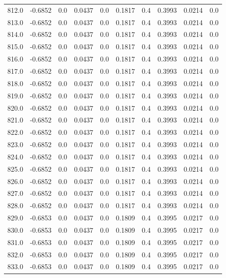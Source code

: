 \begin{longtable}{lrrrrrrrrr}
812.0 & -0.6852 & 0.0 & 0.0437 & 0.0 & 0.1817 & 0.4 & 0.3993 & 0.0214 & 0.0 \\
813.0 & -0.6852 & 0.0 & 0.0437 & 0.0 & 0.1817 & 0.4 & 0.3993 & 0.0214 & 0.0 \\
814.0 & -0.6852 & 0.0 & 0.0437 & 0.0 & 0.1817 & 0.4 & 0.3993 & 0.0214 & 0.0 \\
815.0 & -0.6852 & 0.0 & 0.0437 & 0.0 & 0.1817 & 0.4 & 0.3993 & 0.0214 & 0.0 \\
816.0 & -0.6852 & 0.0 & 0.0437 & 0.0 & 0.1817 & 0.4 & 0.3993 & 0.0214 & 0.0 \\
817.0 & -0.6852 & 0.0 & 0.0437 & 0.0 & 0.1817 & 0.4 & 0.3993 & 0.0214 & 0.0 \\
818.0 & -0.6852 & 0.0 & 0.0437 & 0.0 & 0.1817 & 0.4 & 0.3993 & 0.0214 & 0.0 \\
819.0 & -0.6852 & 0.0 & 0.0437 & 0.0 & 0.1817 & 0.4 & 0.3993 & 0.0214 & 0.0 \\
820.0 & -0.6852 & 0.0 & 0.0437 & 0.0 & 0.1817 & 0.4 & 0.3993 & 0.0214 & 0.0 \\
821.0 & -0.6852 & 0.0 & 0.0437 & 0.0 & 0.1817 & 0.4 & 0.3993 & 0.0214 & 0.0 \\
822.0 & -0.6852 & 0.0 & 0.0437 & 0.0 & 0.1817 & 0.4 & 0.3993 & 0.0214 & 0.0 \\
823.0 & -0.6852 & 0.0 & 0.0437 & 0.0 & 0.1817 & 0.4 & 0.3993 & 0.0214 & 0.0 \\
824.0 & -0.6852 & 0.0 & 0.0437 & 0.0 & 0.1817 & 0.4 & 0.3993 & 0.0214 & 0.0 \\
825.0 & -0.6852 & 0.0 & 0.0437 & 0.0 & 0.1817 & 0.4 & 0.3993 & 0.0214 & 0.0 \\
826.0 & -0.6852 & 0.0 & 0.0437 & 0.0 & 0.1817 & 0.4 & 0.3993 & 0.0214 & 0.0 \\
827.0 & -0.6852 & 0.0 & 0.0437 & 0.0 & 0.1817 & 0.4 & 0.3993 & 0.0214 & 0.0 \\
828.0 & -0.6852 & 0.0 & 0.0437 & 0.0 & 0.1817 & 0.4 & 0.3993 & 0.0214 & 0.0 \\
829.0 & -0.6853 & 0.0 & 0.0437 & 0.0 & 0.1809 & 0.4 & 0.3995 & 0.0217 & 0.0 \\
830.0 & -0.6853 & 0.0 & 0.0437 & 0.0 & 0.1809 & 0.4 & 0.3995 & 0.0217 & 0.0 \\
831.0 & -0.6853 & 0.0 & 0.0437 & 0.0 & 0.1809 & 0.4 & 0.3995 & 0.0217 & 0.0 \\
832.0 & -0.6853 & 0.0 & 0.0437 & 0.0 & 0.1809 & 0.4 & 0.3995 & 0.0217 & 0.0 \\
833.0 & -0.6853 & 0.0 & 0.0437 & 0.0 & 0.1809 & 0.4 & 0.3995 & 0.0217 & 0.0 \\

\end{longtable}
